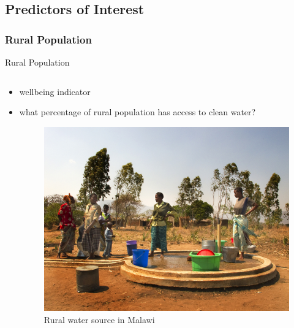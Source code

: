 \documentclass{beamer}
\begin{document}
\subsection{Predictors of Interest}

\subsubsection{Rural Population}

\begin{frame}{Rural Population}

\begin{columns}
  \begin{column}{0.5\textwidth}
    \begin{itemize}
        \item wellbeing indicator
        \item what percentage of rural population has access to clean water?
        \begin{figure}
	\centering
	\includegraphics[scale=0.12]{images/malawi_rural_water.jpg}
	\caption{Rural water source in Malawi}
	\end{figure}
    \end{itemize}
  \end{column}


\end{columns}
\end{frame}
\end{document}
